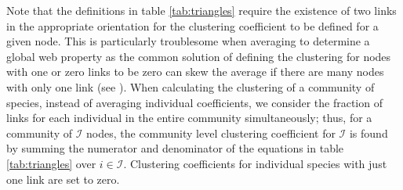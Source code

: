 \documentclass[../dissertation.tex]{subfiles}
\begin{document}
Note that the definitions in table \ref{tab:triangles} require the existence of
two links in the appropriate orientation for the clustering coefficient to be
defined for a given node. This is particularly troublesome when averaging to
determine a global web property as the common solution of defining the
clustering for nodes with one or zero links to be zero can skew the average if
there are many nodes with only one link (see \cite{Kaiser2008}). When
calculating the clustering of a community of species, instead of averaging
individual coefficients, we consider the fraction of links for each individual
in the entire community simultaneously; thus, for a community of $\mathcal{I}$
nodes, the community level clustering coefficient for $\mathcal{I}$ is found by
summing the numerator and denominator of the equations in table
\ref{tab:triangles} over $i\in\mathcal{I}$. Clustering coefficients for
individual species with just one link are set to zero.
\newcommand\makeTriangleNodes[3]{%
            \draw (0,0) node [littleNode,fill=gray70] (#1) {\tiny$_i$};
            \draw (1,0) node [littleNode] (#2) {\tiny$_j$};
            \draw (.5,.866) node [littleNode] (#3) {\tiny$_k$};}
\end{document}
